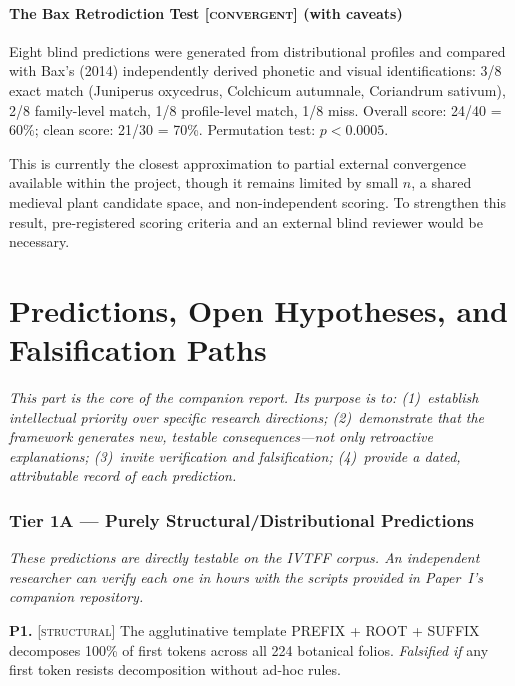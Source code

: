\documentclass[11pt,a4paper]{article}
\newcommand{\structural}{\textsc{[structural]}}
\newcommand{\convergent}{\textsc{[convergent]}}
\newcommand{\falsmark}{\textit{Falsified if}}
\begin{document}
\subsection{The Bax Retrodiction Test \convergent{} (with caveats)}

Eight blind predictions were generated from distributional profiles and compared with Bax's (2014) independently derived phonetic and visual identifications: 3/8 exact match (Juniperus oxycedrus, Colchicum autumnale, Coriandrum sativum), 2/8 family-level match, 1/8 profile-level match, 1/8 miss. Overall score: 24/40 = 60\%; clean score: 21/30 = 70\%. Permutation test: $p < 0.0005$.

This is currently the closest approximation to partial external convergence available within the project, though it remains limited by small $n$, a shared medieval plant candidate space, and non-independent scoring. To strengthen this result, pre-registered scoring criteria and an external blind reviewer would be necessary.

\part{Predictions, Open Hypotheses, and Falsification Paths}

\textit{This part is the core of the companion report. Its purpose is to: (1)~establish intellectual priority over specific research directions; (2)~demonstrate that the framework generates new, testable consequences---not only retroactive explanations; (3)~invite verification and falsification; (4)~provide a dated, attributable record of each prediction.}

\section{Tier 1A --- Purely Structural/Distributional Predictions}

\textit{These predictions are directly testable on the IVTFF corpus. An independent researcher can verify each one in hours with the scripts provided in Paper~I's companion repository.}

\medskip

\noindent\textbf{P1.} \structural{} The agglutinative template PREFIX + ROOT + SUFFIX decomposes 100\% of first tokens across all 224 botanical folios. \falsmark{} any first token resists decomposition without ad-hoc rules.
\end{document}
